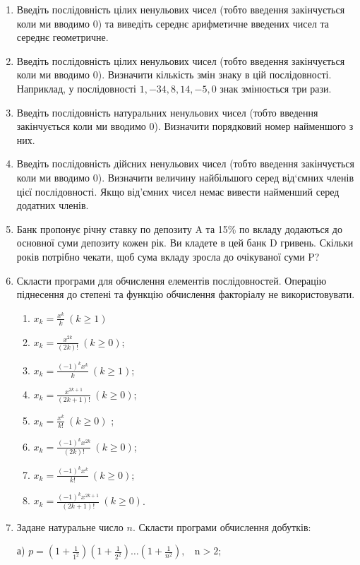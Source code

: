 \documentclass[]{article}
\makeatletter
\newcommand{\xslalph}[1]{\expandafter\@xslalph\csname c@#1\endcsname}
\newcommand{\@xslalph}[1]{%
    \ifcase#1\or а\or б\or в\or г\or д\or e\or є\or ж\or з\or i%
    \or й\or к\or л\or м\or н\or о\or п\or р\or с\or т%
    \or у\or ф\or х\or ц\or ч\or ш\or ю\or я\or аа\or бб\or вв %
    \else\@ctrerr\fi%
}
\makeatother
\begin{document}
\begin{enumerate}
\item
Введіть послідовність цілих ненульових чисел (тобто введення
закінчується коли ми вводимо 0) та виведіть середнє арифметичне введених
чисел та середнє геометричне.
\item
Введіть послідовність цілих ненульових чисел (тобто введення
закінчується коли ми вводимо 0). Визначити кількість змін знаку в цій
послідовності. Наприклад, у послідовності $1, -34, 8, 14, -5, 0$ знак
змінюється три рази.
\item
Введіть послідовність натуральних ненульових чисел (тобто введення
закінчується коли ми вводимо 0). Визначити порядковий номер найменшого з
них.
\item
Введіть послідовність дійсних ненульових чисел (тобто введення
закінчується коли ми вводимо 0). Визначити величину найбільшого серед
від`ємних членів цієї послідовності. Якщо від'ємних чисел немає вивести
найменший серед додатних членів.
\item
Банк пропонує річну ставку по депозиту A та 15\% по вкладу додаються до
основної суми депозиту кожен рік. Ви кладете в цей банк D гривень.
Скільки років потрібно чекати, щоб сума вкладу зросла до очікуваної суми
P?
\item
  Скласти програми для обчислення елементів послідовностей. Операцію
  піднесення до степені та функцію обчислення факторіалу не
  використовувати.
\begin{enumerate}[label=\xslalph*)]
\item
\(x_{k} = \frac{x^{k}}{k}\ (k \geq 1)\) 
\item
\(x_{k} = \frac{x^{2k}}{(2k)!}\ (k \geq 0)\);
\item \(x_{k} = \frac{( - 1)^{k}x^{k}}{k}\ (k \geq 1)\); 
\item
\(x_{k} = \frac{x^{2k + 1}}{(2k + 1)!}\ (k \geq 0)\);
\item \(x_{k} = \frac{x^{k}}{k!}\ (k \geq 0)\) ;
\item \(x_{k} = \frac{(-1)^{k}x^{2k}}{(2k)!}\ (k \geq 0)\);
\item \(x_{k} = \frac{(-1)^{k}x^{k}}{k!}\ (k \geq 0)\); 
\item \(x_{k} = \frac{(-1)^{k}x^{2k + 1}}{(2k + 1)!}\ (k \geq  0)\).
 \end{enumerate}

\item
  Задане натуральне число \(n\). Скласти програми обчислення добутків:

а)
\(p = \left( 1 + \frac{1}{1^{2}} \right)\left( 1 + \frac{1}{2^{2}} \right)\ldots\left( 1 + \frac{1}{n^{2}} \right),\mathrm{\ \ \ \ n > 2};\)


\end{enumerate}
\end{document}

